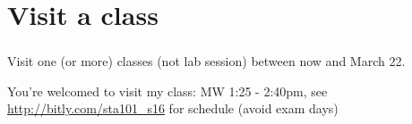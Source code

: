 \documentclass{beamer}
\begin{document}

\section{Visit a class}


\begin{frame}
\frametitle{}

\vfill

Visit one (or more) classes (not lab session) between now and March 22.

\vfill

You're welcomed to visit my class: MW 1:25 - 2:40pm, see \href{http://bitly.com/sta101\_s16}{http://bitly.com/sta101\_s16} for schedule (avoid exam days)

\vfill

\end{frame}

\end{document}
